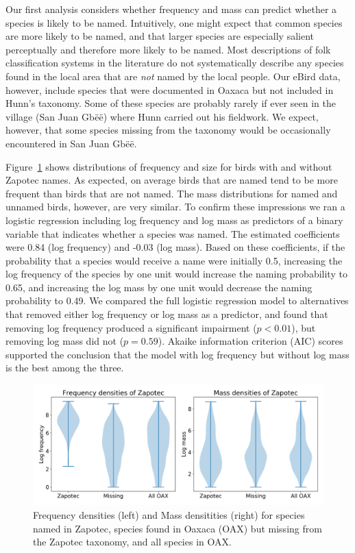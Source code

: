 \documentclass[10pt,letterpaper]{article}
\begin{document}
Our first analysis considers whether frequency and mass can predict whether a species is likely to be named. Intuitively, one might expect that common species are more likely to be named, and that larger species are especially salient perceptually and therefore more likely to be named. Most descriptions of folk classification systems in the literature do not systematically describe any species found in the local area that are \emph{not} named by the local people. Our eBird data, however, include species that were documented in Oaxaca but not included in Hunn's taxonomy. Some of these species are probably rarely if ever seen in the village (San Juan Gb\"{e}\"{e}) where Hunn carried out his fieldwork. We expect, however, that some species missing from the taxonomy would be occasionally encountered in San Juan Gb\"{e}\"{e}. 

Figure~\ref{fig-birdfreqmassviolin} shows distributions of frequency and size for birds with and without Zapotec names.  As expected, on average birds that are named tend to be more frequent than birds that are not named. The mass distributions for named and unnamed birds, however, are very similar. To confirm these impressions we ran a logistic regression including log frequency and log mass as predictors of a binary variable that indicates whether a species was named. The estimated coefficients were 0.84 (log frequency) and -0.03 (log mass). Based on these coefficients, if the probability that a species would receive a name were initially 0.5, increasing the log frequency of the species by one unit would increase the naming probability to 0.65, and increasing the log mass by one unit would decrease the naming probability to 0.49. We compared the full logistic regression model to alternatives that removed either log frequency or log mass as a predictor, and found that removing log frequency produced a significant impairment ($p < 0.01$), but removing log mass did not ($p = 0.59$).  Akaike information criterion (AIC) scores supported the conclusion that the model with log frequency but without log mass is the best among the three. 

\begin{figure}[hbt!]
  \begin{center}
    \includegraphics[width=.95\textwidth]{./figures/birdfreqmass-violinplots.png}
        \caption{Frequency densities (left) and Mass densitities (right) for species named in Zapotec, species found in Oaxaca (OAX) but missing from the Zapotec taxonomy, and all species in OAX.}
        \label{fig-birdfreqmassviolin}
  \end{center}
\end{figure}
\end{document}
